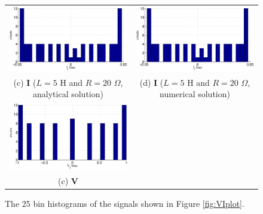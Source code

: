 \documentclass{article}[10pt]
\begin{document}
\begin{figure}[ht]
\begin{center}
\begin{tabular}{cc}
\includegraphics[scale=0.48]{IRCircuitResponseExampleL5R20_Yhist_an.eps} &
\includegraphics[scale=0.48]{IRCircuitResponseExampleL5R20_Yhist_num.eps} \\
(c) $\mathbf{I}$ ($L=5$ H and $R=20$ $\Omega$, analytical solution) & (d) $\mathbf{I}$ ($L=5$ H and $R=20$ $\Omega$, numerical solution)\\
\includegraphics[scale=0.48]{IRCircuitResponseExampleL10R5_Xhist.eps} \\
(c) $\mathbf{V}$
\end{tabular}
\end{center}
\caption{The 25 bin histograms of the signals shown in Figure \ref{fig:VIplot}.}
\label{fig:VIhist}
\end{figure}
\end{document}
